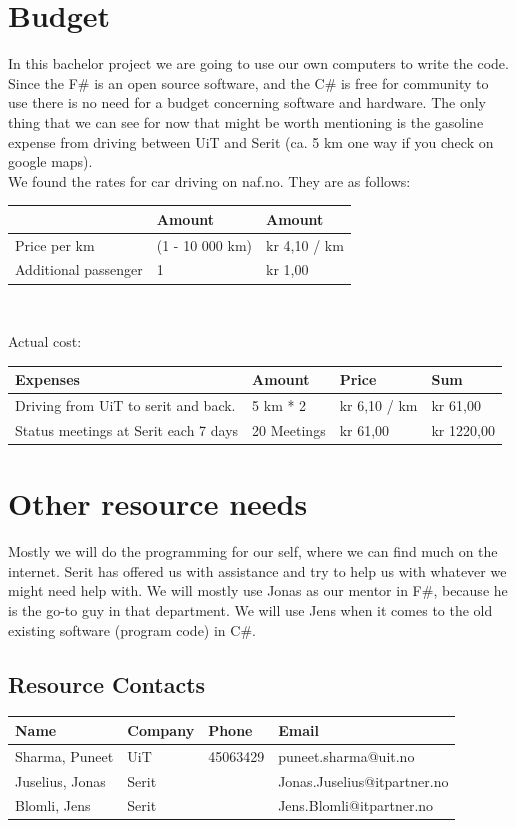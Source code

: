 \documentclass[12pt, a4paper]{article}
\begin{document}
\newpage
\section{Budget}
In this bachelor project we are going to use our own computers to write the code. Since the F\# is an open source software, and the C\# is free for community to use there is no need for a budget concerning software and hardware. The only thing that we can see for now that might be worth mentioning is the gasoline expense from driving between UiT and Serit (ca. 5 km one way if you check on google maps).\\

We found the rates for car driving on naf.no. They are as follows:\\

\begin{tabularx}{\textwidth}{|X|X|X|}
	\hline
	&Amount&Amount\\
	\hline
	Price per km&(1 - 10 000 km)&kr 4,10 / km\\
	\hline
	Additional passenger&1&kr 1,00\\
	\hline
\end{tabularx}\\

\vspace{5mm}

Actual cost:\\

\begin{tabularx}{\textwidth}{|p{50mm}|X|X|X|}
	\hline
	Expenses&Amount&Price&Sum\\
	\hline
	Driving from UiT to serit and back.&5 km * 2&kr 6,10 / km&kr 61,00\\
	\hline
	Status meetings at Serit each 7 days&20 Meetings&kr 61,00&kr 1220,00\\
	\hline
\end{tabularx}

\newpage
\section{Other resource needs}
Mostly we will do the programming for our self, where we can find much on the internet. Serit has offered us with assistance and try to help us with whatever we might need help with. We will mostly use Jonas as our mentor in F\#, because he is the go-to guy in that department. We will use Jens when it comes to the old existing software (program code) in C\#.

\subsection{Resource Contacts}
\begin{tabularx}{\textwidth}{|X|X|X|p{50mm}|}
	\hline
	Name&Company&Phone&Email\\
	\hline
	Sharma, Puneet&UiT&45063429&puneet.sharma@uit.no\\
	\hline
	Juselius, Jonas&Serit&&Jonas.Juselius@itpartner.no\\
	\hline
	Blomli, Jens&Serit&&Jens.Blomli@itpartner.no\\
	\hline
\end{tabularx}
\end{document}
